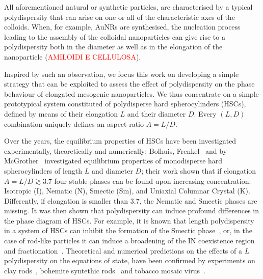 \documentclass[journal=jacsat,manuscript=article]{achemso}
\begin{document}
All aforementioned natural or synthetic particles, are characterised by a typical polydispersity that can arise on one or all of the characteristic axes of the colloids. When,  for example, AuNRs are synthesised,  the nucleation process leading to the assembly of the colloidal nanoparticles can give rise to a polydispersity both in the diameter as well as in the elongation of the nanoparticle (\textcolor{red}{AMILOIDI E CELLULOSA}). 

Inspired by such an observation, we focus this work on developing a simple strategy that can be exploited to assess the effect of polydispersity on the phase behaviour of  elongated mesogenic nanoparticles. We thus concentrate on a simple prototypical system constituted of polydisperse hard spherocylinders (HSCs), defined  by means of their elongation  $L$ and their diameter $D$. Every $(L,D)$ combination uniquely defines an aspect ratio $A=L/D$. 

Over the years, the equilibrium properties of HSCs  have been  investigated  experimentally, theoretically 
and numerically; Bolhuis, Frenkel~\cite{Bolhuis1997} and by McGrother~\cite{McGrother96} investigated equilibrium properties of monodisperse hard spherocylinders of length $L$ and diameter $D$; their work  shown that if elongation $A=L/D \gtrsim 3.7$ four stable phases can be found upon increasing concentration: Isotropic (I), Nematic (N), 
Smectic (Sm), and Uniaxial Columnar Crystal (K). Differently, if elongation is smaller than $3.7$,  the Nematic and Smectic phases 
are missing. 
It was then shown that polydispersity can induce profound differences in the phase diagram of HSCs. For example, 
it is known that  length polydispersity in a system of HSCs can inhibit the formation of 
the Smectic phase~\cite{Bates1998}, or, in the case of rod-like particles it can induce a broadening of the IN coexistence region and fractionation~\cite{Lekkerkerker1984,Speranza2002,Wensink2003}. 
Theoretical and numerical predictions on the effects of a $L$ polydispersity on the equations of state,  have been confirmed by experiments on clay rods~\cite{Woolston2015}, bohemite syntethic rods~\cite{Buining1993} and tobacco mosaic virus~\cite{Fraden1993}. 
\end{document}
